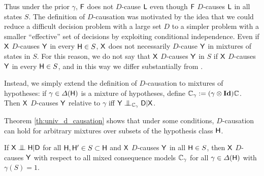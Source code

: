 Thus under the prior $\gamma$, $\mathsf{F}$ does not $D$-cause $\mathsf{L}$ even though $\mathsf{F}$ $D$-causes $\mathsf{L}$ in all states $S$. The definition of $D$-causation was motivated by the idea that we could reduce a difficult decision problem with a large set $D$ to a simpler problem with a smaller ``effective'' set of decisions by exploiting conditional independence. Even if $\mathsf{X}$ $D$-causes $\mathsf{Y}$ in every $\mathsf{H}\in S$, $\mathsf{X}$ does not necessarily $D$-cause $\mathsf{Y}$ in mixtures of states in $S$. For this reason, we do not say that $\mathsf{X}$ $D$-causes $\mathsf{Y}$ in $S$ if $\mathsf{X}$ $D$-causes $\mathsf{Y}$ in every $\mathsf{H}\in S$, and in this way we differ substantially from \citet{heckerman_decision-theoretic_1995}.

Instead, we simply extend the definition of $D$-causation to mixtures of hypotheses: if $\gamma\in \Delta(\mathsf{H})$ is a mixture of hypotheses, define $\mathbb{C}_\gamma:= (\gamma\otimes\textbf{Id})\mathbb{C}$. Then $\mathsf{X}$ $D$-causes $\mathsf{Y}$ relative to $\gamma$ iff $\RV{Y}\CI_{\kernel{C}_\gamma} \RV{D}|\RV{X}$.

Theorem \ref{th:univ_d_causation} shows that under some conditions, $D$-causation can hold for arbitrary mixtures over subsets of the hypothesis class $\mathsf{H}$.

\begin{theorem}\label{th:univ_d_causation}
If $\RV{X}\CI\RV{H}|\RV{D}$ for all $\mathsf{H},\mathsf{H}'\in S\subset \mathsf{H}$ and $\mathsf{X}$ $D$-causes $\mathsf{Y}$ in all $\mathsf{H}\in S$, then $\mathsf{X}$ $D$-causes $\mathsf{Y}$ with respect to all mixed consequence models $\mathbb{C}_\gamma$ for all $\gamma\in \Delta(\mathsf{H})$ with $\gamma(S)=1$.
\end{theorem}

